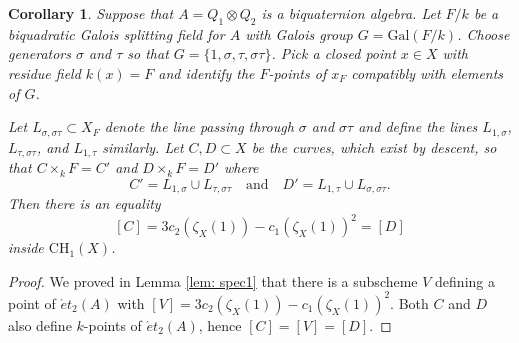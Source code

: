 \documentclass[12pt]{amsart}
\newtheorem{cor}[thm]{Corollary}
\theoremstyle{definition}
\newcommand{\CH}{\mathrm{CH}}
\begin{document}
\begin{cor}\label{cor: curvescd}
Suppose that $A=Q_1\otimes Q_2$ is a biquaternion algebra. Let $F/k$ be a biquadratic Galois splitting field for $A$ with Galois group $G=\mathrm{Gal}(F/k)$. Choose generators $\sigma$ and $\tau$ so that $G=\{1,\sigma,\tau,\sigma\tau\}$. Pick a closed point $x\in X$ with residue field $k(x)=F$ and identify the $F$-points of $x_F$ compatibly with elements of $G$. 

Let $L_{\sigma,\sigma\tau}\subset X_F$ denote the line passing through $\sigma$ and $\sigma\tau$ and define the lines $L_{1,\sigma}$, $L_{\tau,\sigma\tau}$, and $L_{1,\tau}$ similarly. Let $C,D\subset X$ be the curves, which exist by descent, so that $C\times_k F=C'$ and $D\times_k F=D'$ where \[ C'=L_{1,\sigma}\cup L_{\tau,\sigma\tau} \quad \mbox{and}\quad D'=L_{1,\tau}\cup L_{\sigma,\sigma\tau}.\] Then there is an equality \[[C]=3c_2(\zeta_X(1))-c_1(\zeta_X(1))^2=[D]\] inside $\CH_1(X)$.
\end{cor}

\begin{proof}
We proved in Lemma \ref{lem: spec1} that there is a subscheme $V$ defining a point of $\acute{e}t_2(A)$ with $[V]=3c_2(\zeta_X(1))-c_1(\zeta_X(1))^2$. Both $C$ and $D$ also define $k$-points of $\acute{e}t_2(A)$, hence $[C]=[V]=[D]$.  
\end{proof}



\end{document}
